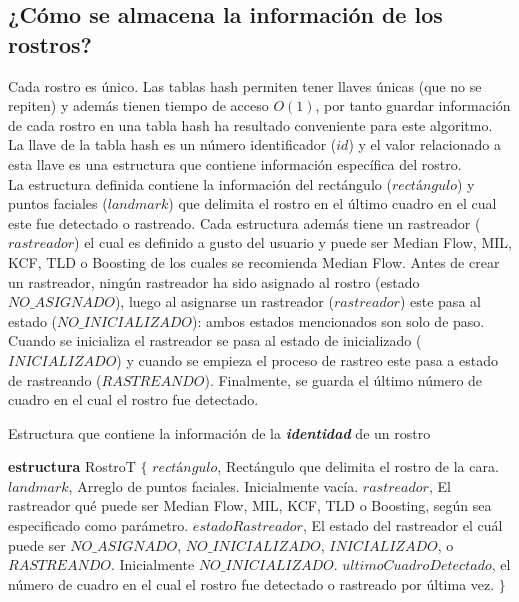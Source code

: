 \documentclass[a4paper,openright,12pt]{report}
\begin{document}
\subsection{¿Cómo se almacena la información de los rostros?}
Cada rostro es único. Las tablas hash permiten tener llaves únicas (que no se
repiten) y además tienen tiempo de acceso $O(1)$, por tanto guardar información
de cada rostro en una tabla hash ha resultado conveniente para este algoritmo.
La llave de la tabla hash es un número identificador ($id$) y el valor
relacionado a esta llave es una estructura que contiene información específica
del rostro.\\
La estructura definida contiene la información del rectángulo ($rectángulo$) y
puntos faciales ($landmark$) que delimita el rostro en el último cuadro en el
cual este fue detectado o rastreado. Cada estructura además tiene un rastreador
($rastreador$) el cual es definido a gusto del usuario y puede ser Median Flow,
MIL, KCF, TLD o Boosting de los cuales se recomienda Median Flow. Antes de crear
un rastreador, ningún rastreador ha sido asignado al rostro (estado
$NO\_ASIGNADO$), luego al asignarse un rastreador ($rastreador$) este pasa al
estado ($NO\_INICIALIZADO$): ambos estados mencionados son solo de paso. Cuando
se inicializa el rastreador se pasa al estado de inicializado ($INICIALIZADO$)
y cuando se empieza el proceso de rastreo este pasa a estado de rastreando
($RASTREANDO$). Finalmente, se guarda el último número de cuadro en el cual el
rostro fue detectado.

\begin{algorithm}
\caption{Estructura que contiene la información de la \textit{\textbf{identidad}}
         de un rostro}
\label{euclid}
\begin{algorithmic}
\State \textbf{estructura} RostroT $\{$
\Indent
  \State $rectángulo$, Rectángulo que delimita el rostro de la cara.
  \State $landmark$, Arreglo de puntos faciales. Inicialmente vacía.
  \State $rastreador$, El rastreador qué puede ser Median Flow, MIL,
                        KCF, TLD o Boosting, según sea especificado como
                       parámetro.
  \State $estadoRastreador$, El estado del rastreador el cuál puede ser
                            $NO\_ASIGNADO$, $NO\_INICIALIZADO$, $INICIALIZADO$,
                            o $RASTREANDO$. Inicialmente $NO\_INICIALIZADO$.
  \State $ultimoCuadroDetectado$, el número de cuadro en el cual el rostro fue
                                 detectado o rastreado por última vez.
\EndIndent
\State  $\}$
\end{algorithmic}
\end{algorithm}
\end{document}
